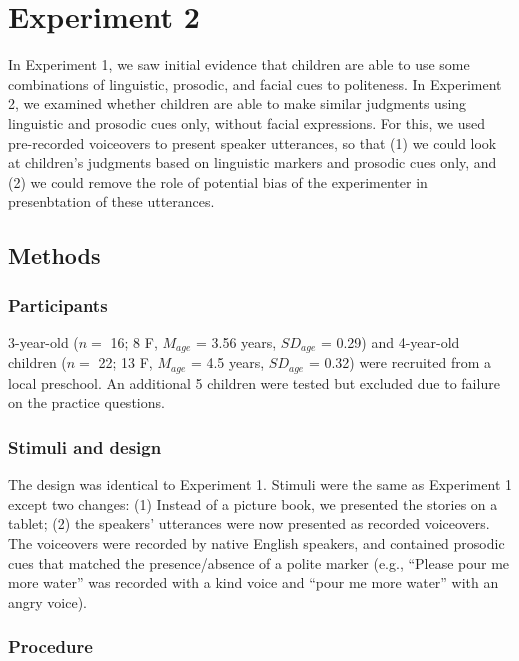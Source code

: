 \documentclass[10pt, letterpaper]{article}
\begin{document}
\section{Experiment 2}\label{experiment-2}

In Experiment 1, we saw initial evidence that children are able to use
some combinations of linguistic, prosodic, and facial cues to
politeness. In Experiment 2, we examined whether children are able to
make similar judgments using linguistic and prosodic cues only, without
facial expressions. For this, we used pre-recorded voiceovers to present
speaker utterances, so that (1) we could look at children's judgments
based on linguistic markers and prosodic cues only, and (2) we could
remove the role of potential bias of the experimenter in presenbtation
of these utterances.

\subsection{Methods}\label{methods-1}

\subsubsection{Participants}\label{participants-1}

3-year-old (\(n=\) 16; 8 F, \(M_{age}\) = 3.56 years, \(SD_{age}\) =
0.29) and 4-year-old children (\(n=\) 22; 13 F, \(M_{age}\) = 4.5 years,
\(SD_{age}\) = 0.32) were recruited from a local preschool. An
additional 5 children were tested but excluded due to failure on the
practice questions.

\subsubsection{Stimuli and design}\label{stimuli-and-design-1}

The design was identical to Experiment 1. Stimuli were the same as
Experiment 1 except two changes: (1) Instead of a picture book, we
presented the stories on a tablet; (2) the speakers' utterances were now
presented as recorded voiceovers. The voiceovers were recorded by native
English speakers, and contained prosodic cues that matched the
presence/absence of a polite marker (e.g., ``Please pour me more water''
was recorded with a kind voice and ``pour me more water'' with an angry
voice).

\subsubsection{Procedure}\label{procedure-1}
\end{document}
